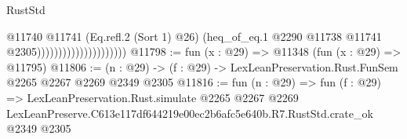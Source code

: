 \begin{lexlean}{RustStd}
\begin{coremodule}
                                          @11740
                                            @11741
                                            (Eq.refl.{2} (Sort 1) @26)
                                            (heq_of_eq.{1}
                                              @2290
                                              @11738
                                              @11741
                                              @2305)))))))))))))))))))))
@11798 := fun (x : @29) => @11348 (fun (x : @29) => @11795)
@11806 := (n : @29) -> (f : @29) -> LexLeanPreservation.Rust.FunSem @2265 @2267 @2269 @2349 @2305
@11816 := fun (n : @29) =>
  fun (f : @29) =>
  LexLeanPreservation.Rust.simulate
    @2265
    @2267
    @2269
    LexLeanPreserve.C613e117df644219e00ec2b6afc5e640b.R7.RustStd.crate_ok
    @2349
    @2305
\end{coremodule}
\end{lexlean}
